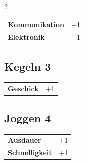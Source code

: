 \begin{multicols}{2}
\begin{tcolorbox}
\begin{tabular}{@{}ll@{}}
    \textbf{Kommunikation} & +1\\
    \textbf{Elektronik} & +1\\
\end{tabular}


\end{tcolorbox}

\begin{tcolorbox}
    \subsection*{Kegeln \hfill \small{3 }}
    \tcblower




\begin{tabular}{@{}ll@{}}
    \textbf{Geschick} & +1\\
\end{tabular}


\end{tcolorbox}

\begin{tcolorbox}
    \subsection*{Joggen \hfill \small{4 }}
    \tcblower




\begin{tabular}{@{}ll@{}}
    \textbf{Ausdauer} & +1\\
    \textbf{Schnelligkeit} & +1\\
\end{tabular}



\end{tcolorbox}
\end{multicols}
